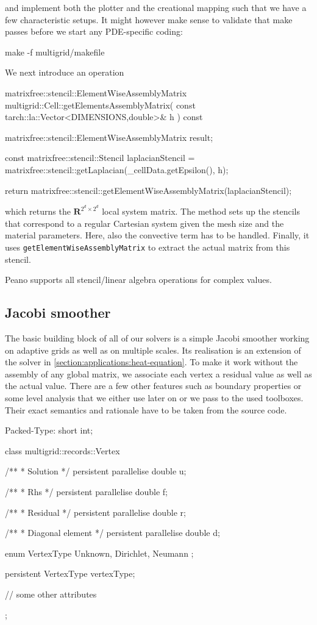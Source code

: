 \noindent
and implement both the plotter and the creational mapping such that we have a
few characteristic setups. 
It might however make sense to validate that make passes before we start any
PDE-specific coding:
\begin{code}
make -f multigrid/makefile
\end{code}


\noindent
We next introduce an operation 
\begin{code}
matrixfree::stencil::ElementWiseAssemblyMatrix multigrid::Cell::getElementsAssemblyMatrix(
  const tarch::la::Vector<DIMENSIONS,double>&  h
) const {
  matrixfree::stencil::ElementWiseAssemblyMatrix result;

  const matrixfree::stencil::Stencil laplacianStencil = 
    matrixfree::stencil::getLaplacian(_cellData.getEpsilon(), h);

  return matrixfree::stencil::getElementWiseAssemblyMatrix(laplacianStencil);
}
\end{code}
which returns the $\mathbf{R}^{2^d \times 2^d}$ local system matrix. 
The method sets up the stencils that correspond to a regular Cartesian system
given the mesh size  and the material parameters.
Here, also the convective term has to be handled.
Finally, it uses \texttt{getElementWiseAssemblyMatrix} to extract the actual
matrix from this stencil.

\begin{remark}
  Peano supports all stencil/linear algebra operations for complex values.
\end{remark}


\subsection{Jacobi smoother}

The basic building block of all of our solvers is a simple Jacobi smoother
working on adaptive grids as well as on multiple scales.
Its realisation is an extension of the solver in \ref{section:applications:heat-equation}.
To make it work without the assembly of any global matrix, we associate each
vertex a residual value as well as the actual value. 
There are a few other features such as boundary properties or some level
analysis that we either use later on or we pass to the used toolboxes. 
Their exact semantics and rationale have to be taken from the source code.

\begin{code}
Packed-Type: short int;


class multigrid::records::Vertex {  
  /**
   * Solution
   */
  persistent parallelise double  u;

  /**
   * Rhs
   */
  persistent parallelise double  f;
  
  /**
   * Residual
   */
  persistent parallelise double   r;

  /**
   * Diagonal element
   */
  persistent parallelise double   d;
  
  enum VertexType {
    Unknown, Dirichlet, Neumann
  };
  
  persistent VertexType vertexType;
  
  // some other attributes
};
\end{code}

